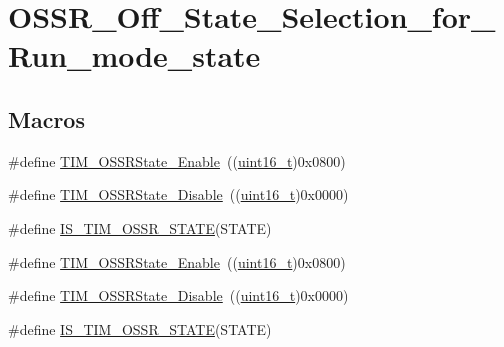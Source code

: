 \hypertarget{group___o_s_s_r___off___state___selection__for___run__mode__state}{}\section{O\+S\+S\+R\+\_\+\+Off\+\_\+\+State\+\_\+\+Selection\+\_\+for\+\_\+\+Run\+\_\+mode\+\_\+state}
\label{group___o_s_s_r___off___state___selection__for___run__mode__state}
\subsection*{Macros}
\begin{DoxyCompactItemize}
\item 
\#define \hyperlink{group___o_s_s_r___off___state___selection__for___run__mode__state_ga3703ba6189db045bec48c864289f997e}{T\+I\+M\+\_\+\+O\+S\+S\+R\+State\+\_\+\+Enable}~((\hyperlink{_p_e___types_8h_a1f1825b69244eb3ad2c7165ddc99c956}{uint16\+\_\+t})0x0800)
\item 
\#define \hyperlink{group___o_s_s_r___off___state___selection__for___run__mode__state_ga766dfd8b3c32ec1b8b446f0e2dbe7b97}{T\+I\+M\+\_\+\+O\+S\+S\+R\+State\+\_\+\+Disable}~((\hyperlink{_p_e___types_8h_a1f1825b69244eb3ad2c7165ddc99c956}{uint16\+\_\+t})0x0000)
\item 
\#define \hyperlink{group___o_s_s_r___off___state___selection__for___run__mode__state_ga48b4f15f6346e28087edbb9af2ba4f63}{I\+S\+\_\+\+T\+I\+M\+\_\+\+O\+S\+S\+R\+\_\+\+S\+T\+A\+TE}(S\+T\+A\+TE)
\item 
\#define \hyperlink{group___o_s_s_r___off___state___selection__for___run__mode__state_ga3703ba6189db045bec48c864289f997e}{T\+I\+M\+\_\+\+O\+S\+S\+R\+State\+\_\+\+Enable}~((\hyperlink{_p_e___types_8h_a1f1825b69244eb3ad2c7165ddc99c956}{uint16\+\_\+t})0x0800)
\item 
\#define \hyperlink{group___o_s_s_r___off___state___selection__for___run__mode__state_ga766dfd8b3c32ec1b8b446f0e2dbe7b97}{T\+I\+M\+\_\+\+O\+S\+S\+R\+State\+\_\+\+Disable}~((\hyperlink{_p_e___types_8h_a1f1825b69244eb3ad2c7165ddc99c956}{uint16\+\_\+t})0x0000)
\item 
\#define \hyperlink{group___o_s_s_r___off___state___selection__for___run__mode__state_ga48b4f15f6346e28087edbb9af2ba4f63}{I\+S\+\_\+\+T\+I\+M\+\_\+\+O\+S\+S\+R\+\_\+\+S\+T\+A\+TE}(S\+T\+A\+TE)
\end{DoxyCompactItemize}


